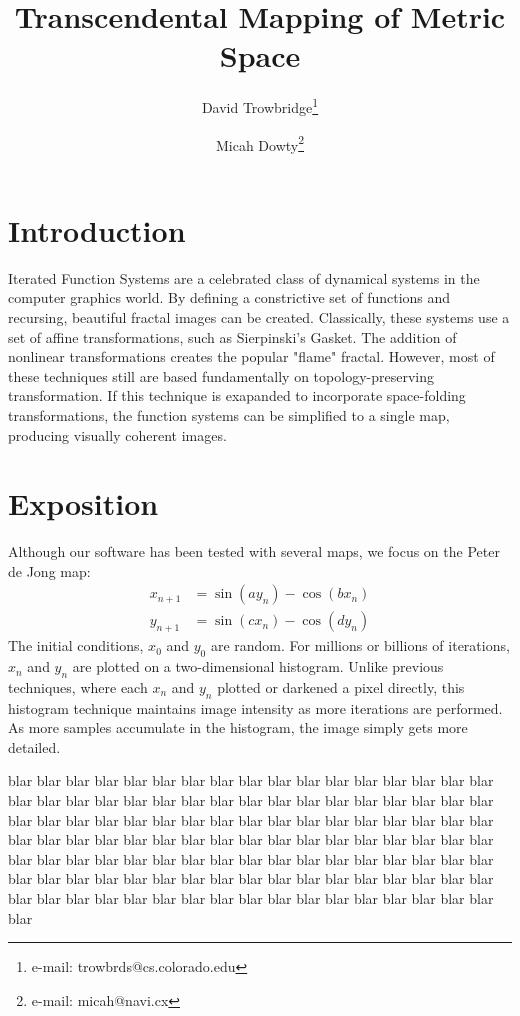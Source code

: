 \documentclass{acmsiggraph}
\title{Transcendental Mapping of Metric Space}
\author{
  David Trowbridge\thanks{e-mail: trowbrds@cs.colorado.edu}
\and
  Micah Dowty\thanks{e-mail: micah@navi.cx}
}
\begin{document}
\maketitle

\section{Introduction}
Iterated Function Systems are a celebrated class of dynamical systems in the
computer graphics world. By defining a constrictive set of functions and
recursing, beautiful fractal images can be created. Classically, these
systems use a set of affine transformations, such as Sierpinski's Gasket.
The addition of nonlinear transformations creates the popular "flame"
fractal. However, most of these techniques still are based fundamentally
on topology-preserving transformation. If this technique is exapanded to
incorporate space-folding transformations, the function systems can be
simplified to a single map, producing visually coherent images.


\section{Exposition}
Although our software has been tested with several maps, we focus
on the Peter de Jong map:
\begin{eqnarray*}
  x_{n+1} &= \sin (a y_n) - \cos (b x_n) \\
  y_{n+1} &= \sin (c x_n) - \cos (d y_n)
\end{eqnarray*}
The initial conditions, $x_0$ and $y_0$ are random. For millions or billions
of iterations, $x_n$ and $y_n$ are plotted on a two-dimensional histogram.
Unlike previous techniques, where each $x_n$ and $y_n$ plotted or darkened
a pixel directly, this histogram technique maintains image intensity as
more iterations are performed. As more samples accumulate in the histogram,
the image simply gets more detailed.



blar blar blar blar blar blar blar blar blar blar blar blar blar blar blar
blar blar blar blar blar blar blar blar blar blar blar blar blar blar blar
blar blar blar blar blar blar blar blar blar blar blar blar blar blar blar
blar blar blar blar blar blar blar blar blar blar blar blar blar blar blar
blar blar blar blar blar blar blar blar blar blar blar blar blar blar blar
blar blar blar blar blar blar blar blar blar blar blar blar blar blar blar
blar blar blar blar blar blar blar blar blar blar blar blar blar blar blar
blar blar blar blar blar blar blar blar blar blar blar blar blar blar blar
\end{document}
